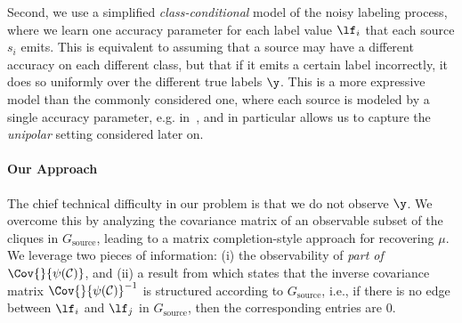 \documentclass[letterpaper]{article}
\begin{document}
Second, we use a simplified \textit{class-conditional} model of the noisy labeling process, where we learn one accuracy parameter for each label value $\lf_i$ that each source $s_i$ emits.
This is equivalent to assuming that a source may have a different accuracy on each different class, but that if it emits a certain label incorrectly, it does so uniformly over the different true labels $\y$.
This is a more expressive model than the commonly considered one, where each source is modeled by a single accuracy parameter, e.g. in~\cite{dawid1979maximum,ratner2016data}, and in particular allows us to capture the \textit{unipolar} setting considered later on.

\paragraph*{Our Approach}
The chief technical difficulty in our problem is that we do not observe $\y$.
We overcome this by analyzing the covariance matrix of an observable subset of the cliques in $G_{\text{source}}$, leading to a matrix completion-style approach for recovering $\mu$.
We leverage two pieces of information: (i) the observability of \textit{part of} $\Cov{}{\psi(\mathcal{C})}$, and (ii) a result from \citep{loh2012structure} which states that the inverse covariance matrix $\Cov{}{\psi(\mathcal{C})}^{-1}$ is structured according to $G_{\text{source}}$, i.e., if there is no edge between $\lf_i$ and $\lf_j$ in $G_{\text{source}}$, then the corresponding entries are 0.
\end{document}
